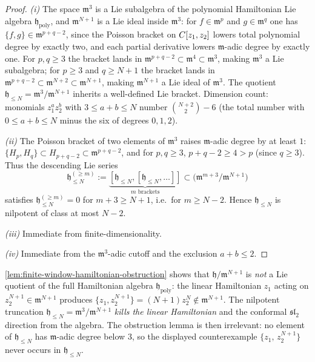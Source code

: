 \begin{proof}
\emph{(i)} The space $\mathfrak m^3$ is a Lie subalgebra of the
polynomial Hamiltonian Lie algebra $\mathfrak h_{\mathrm{poly}}$, and
$\mathfrak m^{N+1}$ is a Lie ideal inside $\mathfrak m^3$: for
$f\in\mathfrak m^p$ and
$g\in\mathfrak m^q$ one has $\{f,g\}\in\mathfrak m^{p+q-2}$, since the
Poisson bracket on $C[z_1,z_2]$ lowers total polynomial degree by
exactly two, and each partial derivative lowers $\mathfrak m$-adic
degree by exactly one. For $p,q\geq 3$ the bracket lands in
$\mathfrak m^{p+q-2}\subset\mathfrak m^4\subset\mathfrak m^3$, making
$\mathfrak m^3$ a Lie subalgebra; for $p\geq 3$ and $q\geq N+1$
the bracket lands in $\mathfrak m^{p+q-2}\subset\mathfrak m^{N+2}
\subset\mathfrak m^{N+1}$, making $\mathfrak m^{N+1}$ a Lie ideal of
$\mathfrak m^3$. The quotient
$\mathfrak h_{\leq N}=\mathfrak m^3/\mathfrak m^{N+1}$ inherits a
well-defined Lie bracket. Dimension count: monomials $z_1^az_2^b$
with $3\leq a+b\leq N$ number $\binom{N+2}{2}-6$ (the total number
with $0\leq a+b\leq N$ minus the six of degrees $0,1,2$).

\emph{(ii)} The Poisson bracket of two elements of
$\mathfrak m^3$ raises $\mathfrak m$-adic degree by at least $1$:
$\{H_p,H_q\}\subset H_{p+q-2}\subset\mathfrak m^{p+q-2}$, and for
$p,q\geq 3$, $p+q-2\geq 4>p$ (since $q\geq 3$). Thus the descending
Lie series
$$\mathfrak h_{\leq N}^{(\geq m)}:=
  \underbrace{[\mathfrak h_{\leq N},[\mathfrak h_{\leq N},\ldots]]}_{m\text{ brackets}}
  \subset\bigl(\mathfrak m^{m+3}/\mathfrak m^{N+1}\bigr)$$
satisfies $\mathfrak h_{\leq N}^{(\geq m)}=0$ for
$m+3\geq N+1$, i.e.\ for $m\geq N-2$. Hence $\mathfrak h_{\leq N}$
is nilpotent of class at most $N-2$.

\emph{(iii)} Immediate from finite-dimensionality.

\emph{(iv)} Immediate from the $\mathfrak m^3$-adic cutoff and the
exclusion $a+b\leq 2$.
\end{proof}

\begin{rmk}
\label{rmk:why-no-finite-window-obstruction}
\ref{lem:finite-window-hamiltonian-obstruction} shows that
$\mathfrak h/\mathfrak m^{N+1}$ is \emph{not} a Lie quotient of the
full Hamiltonian algebra $\mathfrak h_{\mathrm{poly}}$: the linear
Hamiltonian $z_1$ acting on $z_2^{N+1}\in\mathfrak m^{N+1}$ produces
$\{z_1,z_2^{N+1}\}=(N+1)z_2^N\notin\mathfrak m^{N+1}$. The
nilpotent truncation $\mathfrak h_{\leq N}=\mathfrak m^3/
\mathfrak m^{N+1}$ \emph{kills the linear Hamiltonian} and the
conformal $\mathfrak{sl}_2$ direction from the
algebra. The obstruction lemma is then irrelevant: no element of
$\mathfrak h_{\leq N}$ has $\mathfrak m$-adic degree below $3$, so the
displayed counterexample $\{z_1,\,z_2^{N+1}\}$ never occurs in
$\mathfrak h_{\leq N}$.
\end{rmk}

